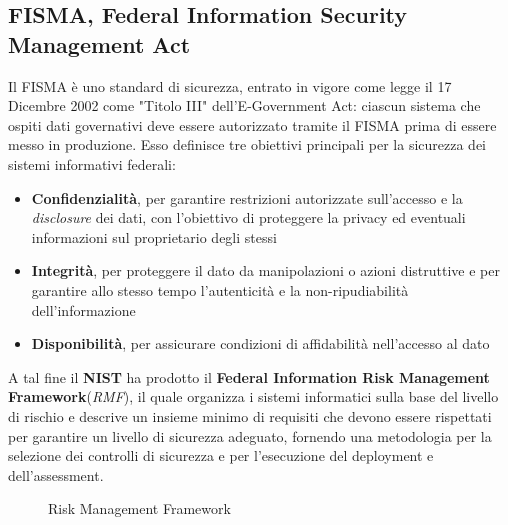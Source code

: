 \documentclass[../main.tex]{subfiles}
\begin{document}
\subsection{FISMA, Federal Information Security Management Act}
Il FISMA è uno standard di sicurezza, entrato in vigore come legge il 17 Dicembre 2002 come "Titolo III" dell'E-Government Act\cite{united2004information}: ciascun sistema che ospiti dati governativi deve essere autorizzato tramite il FISMA prima di essere messo in produzione.
Esso definisce tre obiettivi principali per la sicurezza dei sistemi informativi federali:
\begin{itemize}
    \item \textbf{Confidenzialità}, per garantire restrizioni autorizzate sull'accesso e la \textit{disclosure} dei dati, con l'obiettivo di proteggere la privacy ed eventuali informazioni sul proprietario degli stessi
    \item \textbf{Integrità}, per proteggere il dato da manipolazioni o azioni distruttive e per garantire allo stesso tempo l'autenticità e la non-ripudiabilità dell'informazione
    \item \textbf{Disponibilità}, per assicurare condizioni di affidabilità nell'accesso al dato
\end{itemize}

A tal fine il \textbf{NIST} ha prodotto il \textbf{Federal Information Risk Management Framework}(\textit{RMF}), il quale organizza i sistemi informatici sulla base del livello di rischio e descrive un insieme minimo di requisiti che devono essere rispettati per garantire un livello di sicurezza adeguato\cite{nist2003nist}, fornendo una metodologia per la selezione dei controlli di sicurezza e per l'esecuzione del deployment e dell'assessment.

\begin{figure}[H]
\centering
{}
\caption{Risk Management Framework \cite{nist2003nist} }\label{fig:riskmanagementfw}
\end{figure}
\end{document}

